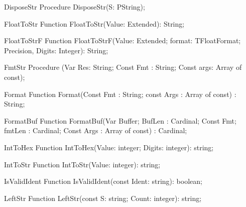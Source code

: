  
\begin{procedure}{DisposeStr}
\Declaration
Procedure DisposeStr(S: PString);
\Description
\Errors
\SeeAlso
\end{procedure}

 
\begin{function}{FloatToStr}
\Declaration
Function FloatToStr(Value: Extended): String;
\Description
\Errors
\SeeAlso
\end{function}

 
\begin{function}{FloatToStrF}
\Declaration
Function FloatToStrF(Value: Extended; format: TFloatFormat; Precision, Digits: Integer): String;
\Description
\Errors
\SeeAlso
\end{function}

 
\begin{procedure}{FmtStr}
\Declaration
Procedure (Var Res: String; Const Fmt : String; Const args: Array of const);
\Description
\Errors
\SeeAlso
\end{procedure}

 
\begin{function}{Format}
\Declaration
Function Format(Const Fmt : String; const Args : Array of const) : String;
\Description
\Errors
\SeeAlso
\end{function}

 
\begin{function}{FormatBuf}
\Declaration
Function FormatBuf(Var Buffer; BufLen : Cardinal; Const Fmt; fmtLen : Cardinal; Const Args : Array of const) : Cardinal;
\Description
\Errors
\SeeAlso
\end{function}

 
\begin{function}{IntToHex}
\Declaration
Function IntToHex(Value: integer; Digits: integer): string;
\Description
\Errors
\SeeAlso
\end{function}

 
\begin{function}{IntToStr}
\Declaration
Function IntToStr(Value: integer): string;
\Description
\Errors
\SeeAlso
\end{function}

 
\begin{function}{IsValidIdent}
\Declaration
Function IsValidIdent(const Ident: string): boolean;
\Description
\Errors
\SeeAlso
\end{function}

 
\begin{function}{LeftStr}
\Declaration
Function LeftStr(const S: string; Count: integer): string;
\Description
\Errors
\SeeAlso
\end{function}

